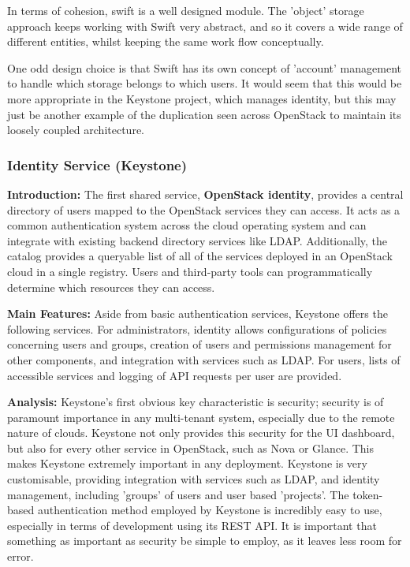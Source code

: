 In terms of cohesion, swift is a well designed module. The 'object' storage approach keeps working with Swift very abstract, and so it covers a wide range of different entities, whilst keeping the same work flow conceptually. 

One odd design choice is that Swift has its own concept of 'account' management to handle which storage belongs to which users. It would seem that this would be more appropriate in the Keystone project, which manages identity, but this may just be another example of the duplication seen across OpenStack to maintain its loosely coupled architecture. 

\subsubsection{Identity Service (Keystone)}
\textbf{Introduction:}
The first shared service, \textbf{OpenStack identity}, provides a central directory of users mapped to the OpenStack services they can access. It acts as a common authentication system across the cloud operating system and can integrate with existing backend directory services like LDAP. Additionally, the catalog 
provides a queryable list of all of the services deployed in an OpenStack cloud in a single registry. Users and third-party tools can programmatically determine which resources they can access. 

\textbf{Main Features:}
Aside from basic authentication services, Keystone offers the following services.
For administrators, identity allows configurations of policies concerning users and groups, creation of users and permissions management for other components, and integration with services such as LDAP. For users, lists of accessible services and logging of API requests per user are provided. 

\textbf{Analysis:}
Keystone's first obvious key characteristic is security; security is of paramount importance in any multi-tenant system, especially due to the remote nature of clouds. Keystone not only provides this security for the UI dashboard, but also for every other service in OpenStack, such as Nova or Glance. This makes Keystone extremely important in any deployment. Keystone is very customisable, providing integration with services such as LDAP, and identity management, including 'groups' of users and user based 'projects'. 
The token-based authentication method employed by Keystone is incredibly easy to use, especially in terms of development using its REST API. It is important that something as important as security be simple to employ, as it leaves less room for error. 

